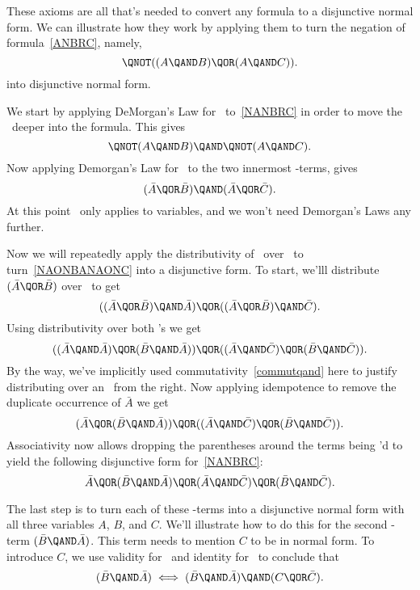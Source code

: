 These axioms are all that's needed to convert any formula to a
disjunctive normal form.  We can illustrate how they work by applying
them to turn the negation of formula~\eqref{ANBRC}, namely,
\begin{equation}\label{NANBRC}
\QNOT((A \QAND B) \QOR (A \QAND C)).
\end{equation}
into disjunctive normal form.

We start by applying DeMorgan's Law for \QOR\ to~\eqref{NANBRC} in
order to move the \QNOT\ deeper into the formula.  This gives
\[
\QNOT(A \QAND B) \QAND \QNOT(A \QAND C).
\]
Now applying Demorgan's Law for \QAND\ to the two
innermost \QAND-terms, gives
\begin{equation}\label{NAONBANAONC}
(\bar{A} \QOR \bar{B}) \QAND (\bar{A} \QOR \bar{C}).
\end{equation}
At this point \QNOT\ only applies to variables, and we won't need
Demorgan's Laws any further.

Now we will repeatedly apply the distributivity of \QAND\ over \QOR\ to
turn~\eqref{NAONBANAONC} into a disjunctive form.  To start, we'lll distribute
$(\bar{A} \QOR \bar{B})$ over \QOR\ to get
\[
((\bar{A} \QOR \bar{B}) \QAND \bar{A}) \QOR ((\bar{A} \QOR \bar{B}) \QAND \bar{C}).
\]
Using distributivity over both \QAND's we get
\[
((\bar{A} \QAND \bar{A}) \QOR (\bar{B} \QAND \bar{A})) \QOR 
((\bar{A} \QAND \bar{C}) \QOR (\bar{B} \QAND \bar{C})).
\]
By the way, we've implicitly used commutativity~\eqref{commutqand}
here to justify distributing over an \QAND\ from the right.  Now
applying idempotence to remove the duplicate occurrence of $\bar{A}$ we
get
\[
(\bar{A} \QOR (\bar{B} \QAND \bar{A})) \QOR 
((\bar{A} \QAND \bar{C}) \QOR (\bar{B} \QAND \bar{C})).
\]
Associativity now allows dropping the parentheses around the terms
being \QOR'd to yield the following disjunctive form for~\eqref{NANBRC}:
\begin{equation}\label{DFNAONBANAONC}
\bar{A} \QOR
(\bar{B} \QAND \bar{A}) \QOR 
(\bar{A} \QAND \bar{C}) \QOR
(\bar{B} \QAND \bar{C}).
\end{equation}

The last step is to turn each of these \QAND-terms into a disjunctive
normal form with all three variables $A$, $B$, and $C$.  We'll
illustrate how to do this for the second \QAND-term
$(\bar{B} \QAND \bar{A})$.  This term needs to mention $C$ to be in
normal form.  To introduce $C$, we use validity for \QOR\ and
identity for \QAND\ to conclude that
\[
(\bar{B} \QAND \bar{A}) \iff (\bar{B} \QAND \bar{A}) \QAND (C \QOR \bar{C}).
\]


